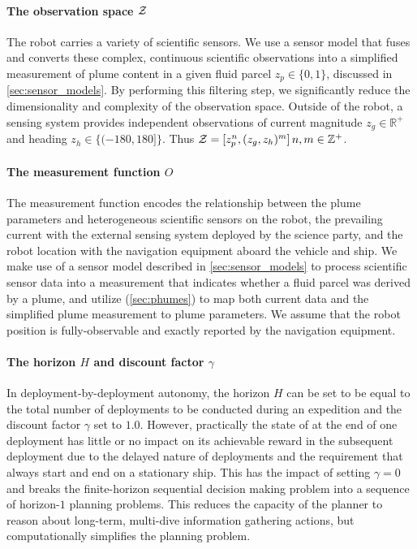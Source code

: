 \paragraph{The observation space $\mathcal{Z}$} The robot carries a variety of scientific sensors. We use a sensor model that fuses and converts these complex, continuous scientific observations into a simplified measurement of plume content in a given fluid parcel $z_p \in \{0, 1\}$, discussed in \cref{sec:sensor_models}. By performing this filtering step, we significantly reduce the dimensionality and complexity of the observation space. Outside of the robot, a sensing system provides independent observations of current magnitude $z_g \in \mathbb{R}^+$ and heading $z_h \in \{(-180, 180]\}$. Thus $\mathcal{Z} = [z_p^n, (z_g, z_h)^m] \, n,m \in \mathbb{Z}^+$.

\paragraph{The measurement function $O$} The measurement function encodes the relationship between the plume parameters and heterogeneous scientific sensors on the robot, the prevailing current with the external sensing system deployed by the science party, and the robot location with the navigation equipment aboard the vehicle and ship. We make use of a sensor model described in \cref{sec:sensor_models} to process scientific sensor data into a measurement that indicates whether a fluid parcel was derived by a plume, and utilize \PHUMES (\cref{sec:phumes}) to map both current data and the simplified plume measurement to plume parameters. We assume that the robot position is fully-observable and exactly reported by the navigation equipment. 

\paragraph{The horizon $H$ and discount factor $\gamma$} In deployment-by-deployment autonomy, the horizon $H$ can be set to be equal to the total number of deployments to be conducted during an expedition and the discount factor $\gamma$ set to $1.0$. However, practically the state of \Sentry at the end of one deployment has little or no impact on its achievable reward in the subsequent deployment due to the delayed nature of deployments and the requirement that \Sentry always start and end on a stationary ship. This has the impact of setting $\gamma=0$ and breaks the finite-horizon sequential decision making problem into a sequence of horizon-$1$ planning problems. This reduces the capacity of the planner to reason about long-term, multi-dive information gathering actions, but computationally simplifies the planning problem.


